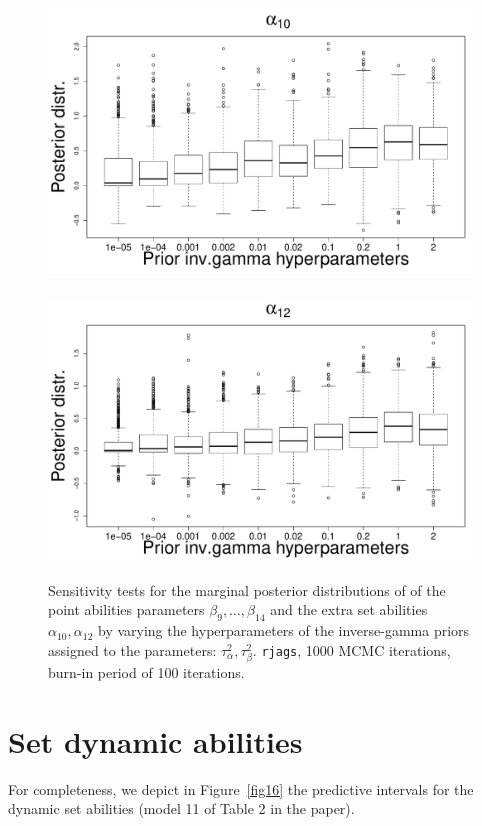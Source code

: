 \documentclass{statsoc}
\begin{document}
\begin{figure}
\includegraphics[scale=0.25]{Sensitivity/alpha_10_sensitivity.pdf}~
\includegraphics[scale=0.25]{Sensitivity/alpha_12_sensitivity.pdf}\\
\caption{Sensitivity tests for the marginal posterior distributions of of the point abilities parameters $\beta_9, \ldots,\beta_{14}$ and the extra set abilities $\alpha_{10}, \alpha_{12}$ by varying the hyperparameters of the inverse-gamma priors assigned to the parameters: $\tau^2_{\alpha}, \tau^2_{\beta}$. {\tt rjags}, 1000 MCMC iterations, burn-in period of 100 iterations.}
\label{figS4}
\end{figure}

\section*{Set dynamic abilities}

For completeness, we depict in Figure~\ref{fig16} the predictive intervals for the dynamic set abilities (model 11 of Table 2 in the paper).
\end{document}
